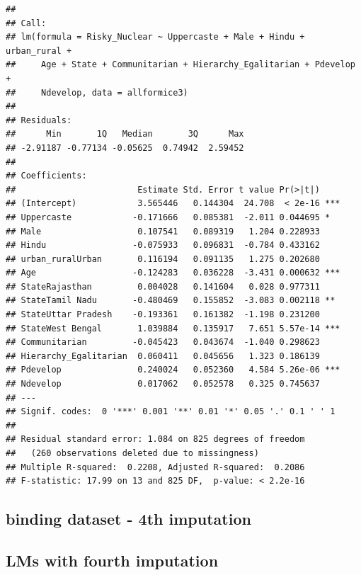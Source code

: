 \documentclass[
]{article}
\begin{document}
\begin{verbatim}
## 
## Call:
## lm(formula = Risky_Nuclear ~ Uppercaste + Male + Hindu + urban_rural + 
##     Age + State + Communitarian + Hierarchy_Egalitarian + Pdevelop + 
##     Ndevelop, data = allformice3)
## 
## Residuals:
##      Min       1Q   Median       3Q      Max 
## -2.91187 -0.77134 -0.05625  0.74942  2.59452 
## 
## Coefficients:
##                        Estimate Std. Error t value Pr(>|t|)    
## (Intercept)            3.565446   0.144304  24.708  < 2e-16 ***
## Uppercaste            -0.171666   0.085381  -2.011 0.044695 *  
## Male                   0.107541   0.089319   1.204 0.228933    
## Hindu                 -0.075933   0.096831  -0.784 0.433162    
## urban_ruralUrban       0.116194   0.091135   1.275 0.202680    
## Age                   -0.124283   0.036228  -3.431 0.000632 ***
## StateRajasthan         0.004028   0.141604   0.028 0.977311    
## StateTamil Nadu       -0.480469   0.155852  -3.083 0.002118 ** 
## StateUttar Pradesh    -0.193361   0.161382  -1.198 0.231200    
## StateWest Bengal       1.039884   0.135917   7.651 5.57e-14 ***
## Communitarian         -0.045423   0.043674  -1.040 0.298623    
## Hierarchy_Egalitarian  0.060411   0.045656   1.323 0.186139    
## Pdevelop               0.240024   0.052360   4.584 5.26e-06 ***
## Ndevelop               0.017062   0.052578   0.325 0.745637    
## ---
## Signif. codes:  0 '***' 0.001 '**' 0.01 '*' 0.05 '.' 0.1 ' ' 1
## 
## Residual standard error: 1.084 on 825 degrees of freedom
##   (260 observations deleted due to missingness)
## Multiple R-squared:  0.2208, Adjusted R-squared:  0.2086 
## F-statistic: 17.99 on 13 and 825 DF,  p-value: < 2.2e-16
\end{verbatim}

\hypertarget{binding-dataset---4th-imputation}{%
\subsection{binding dataset - 4th
imputation}\label{binding-dataset---4th-imputation}}

\hypertarget{lms-with-fourth-imputation}{%
\subsection{LMs with fourth
imputation}\label{lms-with-fourth-imputation}}
\end{document}
